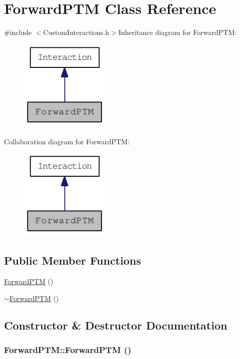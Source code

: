 \hypertarget{classForwardPTM}{
\section{ForwardPTM Class Reference}
\label{classForwardPTM}
}


{\ttfamily \#include $<$CustomInteractions.h$>$}Inheritance diagram for ForwardPTM:\nopagebreak
\begin{figure}[H]
\begin{center}
\leavevmode
\includegraphics[width=122pt]{classForwardPTM__inherit__graph}
\end{center}
\end{figure}
Collaboration diagram for ForwardPTM:\nopagebreak
\begin{figure}[H]
\begin{center}
\leavevmode
\includegraphics[width=122pt]{classForwardPTM__coll__graph}
\end{center}
\end{figure}
\subsection*{Public Member Functions}
\begin{DoxyCompactItemize}
\item 
\hyperlink{classForwardPTM_a42913d0481561a489b8664cd22cf7b0c}{ForwardPTM} ()
\item 
\hyperlink{classForwardPTM_a9fa8aa77099a6bb8d4fbe326a5d84704}{$\sim$ForwardPTM} ()
\end{DoxyCompactItemize}


\subsection{Constructor \& Destructor Documentation}
\hypertarget{classForwardPTM_a42913d0481561a489b8664cd22cf7b0c}{
\subsubsection[{ForwardPTM}]{\setlength{\rightskip}{0pt plus 5cm}ForwardPTM::ForwardPTM ()}}
\label{classForwardPTM_a42913d0481561a489b8664cd22cf7b0c}


